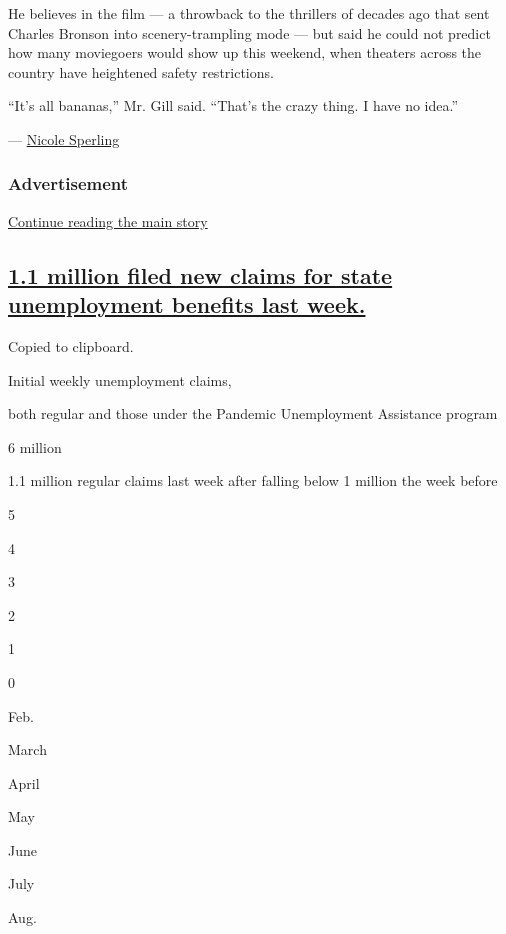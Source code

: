 He believes in the film --- a throwback to the thrillers of decades ago
that sent Charles Bronson into scenery-trampling mode --- but said he
could not predict how many moviegoers would show up this weekend, when
theaters across the country have heightened safety restrictions.

``It's all bananas,'' Mr. Gill said. ``That's the crazy thing. I have no
idea.''

--- \href{https://www.nytimes3xbfgragh.onion/by/nicole-sperling}{Nicole
Sperling}

\hypertarget{advertisement}{%
\subsubsection{Advertisement}\label{advertisement}}

\protect\hyperlink{after-dfp-ad-mid1}{Continue reading the main story}

\hypertarget{11-million-filed-new-claims-for-state-unemployment-benefits-last-week}{%
\subsection{\texorpdfstring{\protect\hyperlink{1-1-million-filed-new-claims-for-state-unemployment-benefits-last-week}{1.1
million filed new claims for state unemployment benefits last
week.}}{1.1 million filed new claims for state unemployment benefits last week.}}\label{11-million-filed-new-claims-for-state-unemployment-benefits-last-week}}

Copied to clipboard.

Initial weekly unemployment claims,

both regular and those under the Pandemic Unemployment Assistance
program

6 million

1.1 million regular claims last week after falling below 1 million the
week before

5

4

3

2

1

0

Feb.

March

April

May

June

July

Aug.

